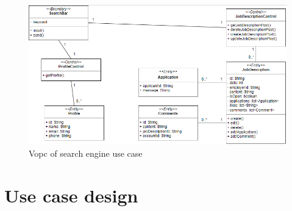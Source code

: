 \documentclass[a4paper]{article}
\begin{document}
\begin{figure}[H]
  \centering
  \includegraphics[width=1.0\textwidth]{vopc_search_engine.png}
  \caption{Vopc of search engine use case}
  \label{fig:fig31}
\end{figure}

\pagebreak
\section{Use case design}
\end{document}
